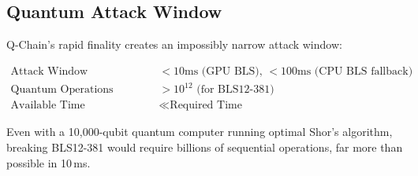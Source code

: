 \subsection{Quantum Attack Window}

Q-Chain's rapid finality creates an impossibly narrow attack window:

\begin{align}
\text{Attack Window} &< 10\text{ms (GPU BLS), } < 100\text{ms (CPU BLS fallback)} \\
\text{Quantum Operations Required} &> 10^{12} \text{ (for BLS12-381)} \\
\text{Available Time} &\ll \text{Required Time}
\end{align}

Even with a 10,000-qubit quantum computer running optimal Shor's algorithm, breaking BLS12-381 would require billions of sequential operations, far more than possible in 10\,ms.

